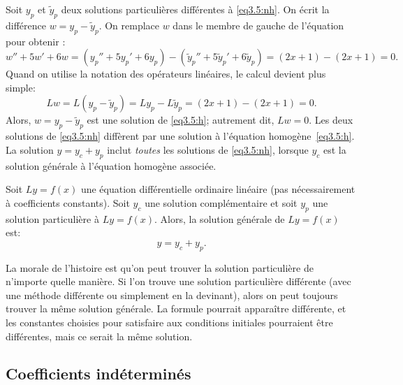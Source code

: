 Soit $y_p$ et $\tilde{y}_p$ deux solutions particulières différentes à \eqref{eq3.5:nh}.
On écrit la différence
$w = y_p - \tilde{y}_p$.  On remplace $w$
dans le membre de gauche de l'équation pour obtenir : 
\begin{equation*}
	w'' + 5w'+ 6w 	= 	(y_p'' + 5y_p'+ 6y_p) - (\tilde{y}_p'' + 5\tilde{y}_p'+ 6\tilde{y}_p) 
					=	(2x+1) - (2x+1) = 0 .
\end{equation*}
Quand on utilise la notation des opérateurs linéaires, le calcul devient plus simple:  
\begin{equation*}
	Lw = L(y_p - \tilde{y}_p) =	Ly_p - L\tilde{y}_p = (2x+1)-(2x+1) = 0 .
\end{equation*}
Alors, $w = y_p - \tilde{y}_p$ est une solution de \eqref{eq3.5:h}; autrement dit,
$Lw = 0$.  Les deux solutions de \eqref{eq3.5:nh} diffèrent par une solution à l'équation homogène~\eqref{eq3.5:h}.  La solution  $y = y_c + y_p$ inclut \emph{toutes} les solutions de \eqref{eq3.5:nh}, 
lorsque $y_c$ est la solution générale à l'équation homogène associée. 

\begin{theorem}
	Soit $Ly=f(x)$ une équation différentielle ordinaire linéaire (pas nécessairement à coefficients constants).  Soit  $y_c$ une solution complémentaire et soit $y_p$ une solution particulière à $Ly=f(x)$.  
	Alors, la solution générale de $Ly=f(x)$ est: 
	\begin{equation*}
		y = y_c + y_p.
	\end{equation*}
\end{theorem}

La morale de l'histoire est qu'on peut trouver la solution particulière de n'importe quelle manière. 
Si l'on trouve une solution particulière différente (avec une méthode différente ou simplement en la devinant), alors on peut toujours trouver la même solution générale. 
La formule pourrait apparaître différente, et les constantes choisies pour satisfaire aux conditions initiales pourraient être différentes, mais ce serait la même solution.  



\subsection{Coefficients indéterminés}

